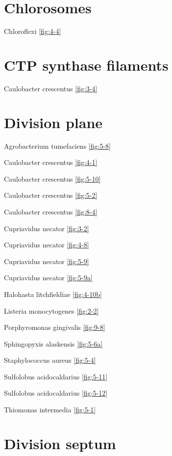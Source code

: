 \documentclass[]{tufte-book}
\begin{document}
\section*{Chlorosomes}\label{chlorosomes}

Chloroflexi \ref{fig:4-4}

\section*{CTP synthase filaments}\label{ctp-synthase-filaments}

Caulobacter crescentus \ref{fig:3-4}

\section*{Division plane}\label{division-plane}

Agrobacterium tumefaciens \ref{fig:5-8}

Caulobacter crescentus \ref{fig:4-1}

Caulobacter crescentus \ref{fig:5-10}

Caulobacter crescentus \ref{fig:5-2}

Caulobacter crescentus \ref{fig:8-4}

Cupriavidus necator \ref{fig:3-2}

Cupriavidus necator \ref{fig:4-8}

Cupriavidus necator \ref{fig:5-9}

Cupriavidus necator \ref{fig:5-9a}

Halohasta litchfieldiae \ref{fig:4-10b}

Listeria monocytogenes \ref{fig:2-2}

Porphyromonas gingivalis \ref{fig:9-8}

Sphingopyxis alaskensis \ref{fig:5-6a}

Staphylococcus aureus \ref{fig:5-4}

Sulfolobus acidocaldarius \ref{fig:5-11}

Sulfolobus acidocaldarius \ref{fig:5-12}

Thiomonas intermedia \ref{fig:5-1}

\section*{Division septum}\label{division-septum}
\end{document}
